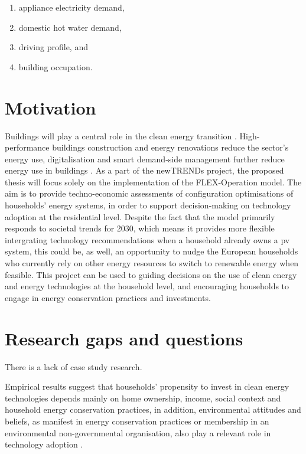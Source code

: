 \begin{enumerate}
  \item appliance electricity demand,
  \item domestic hot water demand,
  \item driving profile, and
  \item building occupation.
\end{enumerate}




\section{Motivation}




Buildings will play a central role in the clean energy transition \cite{building}.
High-performance buildings construction and energy renovations reduce the sector’s energy use, digitalisation and smart demand-side management further reduce energy use in buildings \cite{building}.  
As a part of the newTRENDs project, 
the proposed thesis will focus solely on 
the implementation of the FLEX-Operation model.  
The aim is to provide techno-economic assessments 
of configuration optimisations of households' energy systems, 
in order to support decision-making on technology adoption at the residential level. 
Despite the fact that the model primarily responds to societal trends for 2030, 
which means it provides more flexible intergrating technology recommendations when a household already owns a \gls{pv} system, 
this could be, as well, an opportunity to nudge the European households who currently rely on other energy resources
to switch to renewable energy when feasible. 
This project can be used to 
guiding decisions on the use of clean energy and energy technologies at the household level, 
and encouraging households to engage in energy conservation practices and investments. 


\section{Research gaps and questions}


There is a lack of case study research. 

Empirical results suggest that households' propensity to invest in clean energy technologies depends mainly on home ownership, income, social context and household energy conservation practices,
in addition, environmental attitudes and beliefs, as manifest in energy conservation practices or membership in an environmental non-governmental organisation, also play a relevant role in technology adoption \cite{determinants}.

